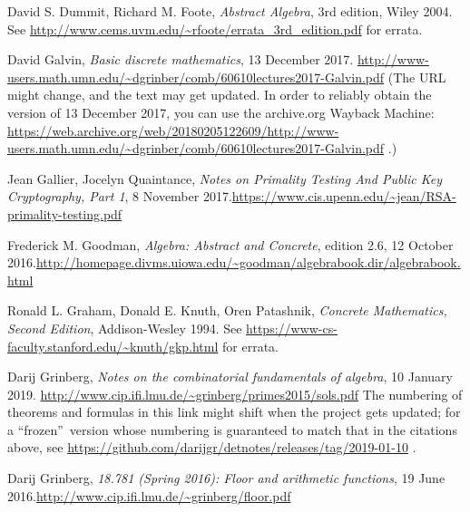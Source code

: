 \documentclass[numbers=enddot,12pt,final,onecolumn,notitlepage]{scrartcl}%
\numberwithin{exer}{subsection}
\theoremstyle{definition}
\begin{document}
\begin{thebibliography}{999999999}
David S. Dummit, Richard M. Foote,
\textit{Abstract Algebra}, 3rd edition, Wiley 2004. \newline See
\url{http://www.cems.uvm.edu/~rfoote/errata_3rd_edition.pdf} for errata.

David Galvin, \textit{Basic discrete mathematics},
13 December 2017.\newline%
\url{http://www-users.math.umn.edu/~dgrinber/comb/60610lectures2017-Galvin.pdf}
\newline(The URL might change, and the text may get updated. In order to
reliably obtain the version of 13 December 2017, you can use the archive.org
Wayback Machine:
\url{https://web.archive.org/web/20180205122609/http://www-users.math.umn.edu/~dgrinber/comb/60610lectures2017-Galvin.pdf}
.)

Jean Gallier, Jocelyn Quaintance, \textit{Notes
on Primality Testing And Public Key Cryptography, Part 1}, 8 November
2017.\newline\url{https://www.cis.upenn.edu/~jean/RSA-primality-testing.pdf}

Frederick M. Goodman, \textit{Algebra: Abstract and
Concrete}, edition 2.6, 12 October 2016.\newline\url{http://homepage.divms.uiowa.edu/~goodman/algebrabook.dir/algebrabook.html}

Ronald L. Graham, Donald E. Knuth, Oren Patashnik,
\textit{Concrete Mathematics, Second Edition}, Addison-Wesley 1994.\newline
See \url{https://www-cs-faculty.stanford.edu/~knuth/gkp.html} for errata.

Darij Grinberg, \textit{Notes on the combinatorial
fundamentals of algebra}, 10 January 2019.\newline%
\url{http://www.cip.ifi.lmu.de/~grinberg/primes2015/sols.pdf} \newline The
numbering of theorems and formulas in this link might shift when the project
gets updated; for a \textquotedblleft frozen\textquotedblright\ version whose
numbering is guaranteed to match that in the citations above, see
\url{https://github.com/darijgr/detnotes/releases/tag/2019-01-10} .

Darij Grinberg, \textit{18.781 (Spring 2016): Floor
and arithmetic functions}, 19 June 2016.\newline\url{http://www.cip.ifi.lmu.de/~grinberg/floor.pdf}


\end{thebibliography}
\end{document}
